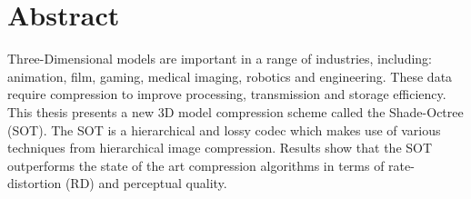 \makeatletter
\chapter{Abstract}


Three-Dimensional models are important in a range of industries, including: animation, film, gaming, medical imaging, robotics and engineering. These data require compression to improve processing, transmission and storage efficiency. This thesis presents a new 3D model compression scheme called the Shade-Octree (SOT). The SOT is a hierarchical and lossy codec which makes use of various techniques from hierarchical image compression. Results show that the SOT outperforms the state of the art compression algorithms in terms of rate-distortion (RD) and perceptual quality. 
